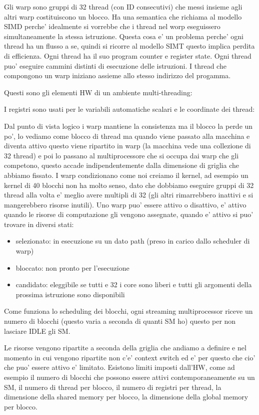 Gli warp sono gruppi di 32 thread (con ID consecutivi) che messi insieme agli altri warp costituiscono un blocco. Ha una semantica che richiama al modello SIMD perche' idealmente si vorrebbe che i thread nel worp eseguissero simultaneamente la stessa istruzione. Questa cosa e' un problema perche' ogni thread ha un flusso a se, quindi si ricorre al modello SIMT questo implica perdita di efficienza. Ogni thread ha il suo program counter e register state. Ogni thread puo' eseguire cammini distinti di esecuzione delle istruzioni. I thread che compongono un warp iniziano assieme allo stesso indirizzo del progamma.

Questi sono gli elementi HW di un ambiente multi-threading:

I registri sono usati per le variabili automatiche scalari e le coordinate dei thread:

Dal punto di vista logico i warp mantiene la consistenza ma il blocco la perde un po', lo vediamo come blocco di thread ma quando viene passato alla macchina e diventa attivo questo viene ripartito in warp (la macchina vede una collezione di 32 thread) e poi lo passano al multiprocessore che si occupa dai warp che gli competono, questo accade indipendentemente dalla dimensione di griglia che abbiamo fissato.
I warp condizionano come noi creiamo il kernel, ad esempio un kernel di 40 blocchi non ha molto senso, dato che dobbiamo eseguire gruppi di 32 thread alla volta e' meglio avere multipli di 32 (gli altri rimarrebbero inattivi e si mangerebbero risorse inutili).
Uno warp puo' essere attivo o disattivo, e' attivo quando le risorse di computazione gli vengono assegnate, quando e' attivo si puo' trovare in diversi stati:
\begin{itemize}
    \item selezionato: in esecuzione su un dato path (preso in carico dallo scheduler di warp)
    \item bloccato: non pronto per l'esecuzione
    \item candidato: eleggibile se tutti e 32 i core sono liberi e tutti gli argomenti della prossima istruzione sono disponibili
\end{itemize}

Come funziona lo scheduling dei blocchi, ogni streaming multiprocessor riceve un numero di blocchi (questo varia a seconda di quanti SM ho) questo per non lasciare IDLE gli SM.

Le risorse vengono ripartite a seconda della griglia che andiamo a definire e nel momento in cui vengono ripartite non c'e' context switch ed e' per questo che cio' che puo' essere attivo e' limitato.
Esistono limiti imposti dall'HW, come ad esempio il numero di blocchi che possono essere attivi contemporaneamente su un SM, il numero di thread per blocco, il numero di registri per thread, la dimensione della shared memory per blocco, la dimensione della global memory per blocco. 

